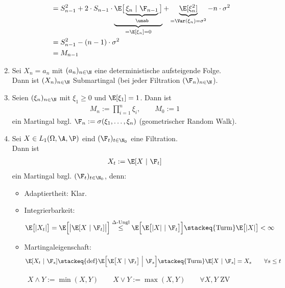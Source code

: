 \begin{beisp}
\begin{enumerate}[label=(\alph*)]
\begin{itemize}
\begin{align*}
&=S_{n-1}^2+2\cdot S_{n-1}\cdot \underbrace{\E\big[\underbrace{\xi_n~|~\F_{n-1}}_{\unab}\big]}_{=\E[\xi_n]=0}+\underbrace{\E[\xi_n^2]}_{=\Var(\xi_n)=\sigma^2}-n\cdot\sigma^2\\
&=S_{n-1}^2-(n-1)\cdot\sigma^2\\
&=M_{n-1}
\end{align*}
\end{itemize}
\item Sei $X_n=a_n$ mit $(a_n)_{n\in\N}$ eine deterministische aufsteigende Folge.\\
Dann ist $(X_n)_{n\in\N}$ Submartingal (bei jeder Filtration $(\F_n)_{n\in\N}$).
\item Seien $(\xi_n)_{n\in\N}$ mit $\xi_1\geq0$ und $\E[\xi_1]=1$. Dann ist
\begin{align*}
M_n:=\prod\limits_{i=1}^n\xi_i,\qquad M_0:=1
\end{align*}
ein Martingal bzgl. $\F_n:=\sigma(\xi_1,\ldots,\xi_n)$ (geometrischer Random Walk).
\item Sei $X\in L_1(\Omega,\A,\P)$ eind $(\F_t)_{t\in\N_0}$ eine Filtration.\\
Dann ist
\begin{align*}
X_t:=\E[X~|~\F_t]
\end{align*}
ein Martingal bzgl. $(\F_t)_{t\in\N_0}$, denn:
\begin{itemize}
\item Adaptiertheit: Klar.
\item Integrierbarkeit:
\begin{align*}
\E\big[|X_t|\big]
=\E\Big[\big|\E[X~|~\F_t]\big|\Big]
&\stackrel{\Delta\text{-Ungl}}{\leq}
\E\Big[\E\big[|X|~|~\F_t \big]\Big]
\stackeq{\text{Turm}}
\E\big[|X|\big]
<\infty
\end{align*}
\item Martingaleigenschaft:
\begin{align*}
\E[X_t~|~\F_s]
\stackeq{\text{def}}\E\Big[\E\big[X~|~\F_t\big]~\Big|~ \F_s\Big]
\stackeq{\text{Turm}}
\E[X~|~\F_s]
=X_s
\qquad\forall s\leq t
\end{align*}
\end{itemize}
\end{enumerate}
\end{beisp}

\begin{notation}
\begin{align*}
X\wedge Y:=\min(X,Y)\qquad X\vee Y:=\max(X,Y)\qquad\forall X,Y\text{ ZV}
\end{align*}
\end{notation}

